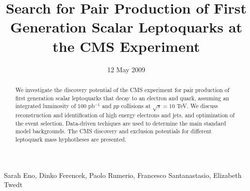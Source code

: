 
%
\begin{titlepage}

   \date{12 May 2009}


  \title{Search for Pair Production of First Generation Scalar Leptoquarks at the CMS Experiment}

  \begin{Authlist}
   Sarah Eno, Dinko Ferencek, Paolo Rumerio, Francesco Santanastasio, Elizabeth Twedt
  \end{Authlist}


  \begin{abstract}
    We investigate the discovery potential of the CMS experiment
    for pair production of first generation scalar leptoquarks that 
    decay to an electron and quark, assuming 
    an integrated luminosity of 100 pb$^{-1}$ and $pp$ collisions 
    at $\sqrt{s}=10$ TeV.
    We discuss 
   reconstruction and identification of high energy electrons and jets, 
    and optimization of the event selection.
    Data-driven techiques are used to determine 
the main standard model backgrounds. 
The CMS discovery and exclusion potentials for different leptoquark 
mass hyphotheses are presented.



%
  \end{abstract} 

\end{titlepage}

